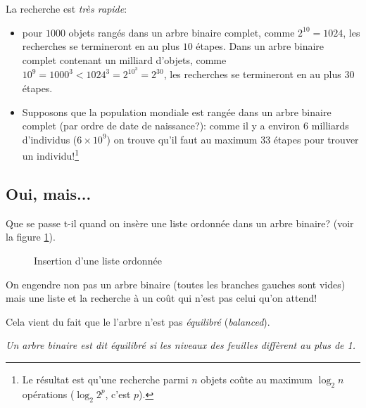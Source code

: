 La recherche est \emph{très rapide}:
\begin{itemize}
  \item pour $1000$ objets rangés dans un arbre binaire complet, comme
    $2^{10} =1024$, les recherches se termineront en au plus $10$
    étapes. Dans un arbre binaire complet contenant un milliard d'objets,
    comme  $10^9 = 1000^3 < 1024^3 = 2^{10^3} = 2^{30}$, les 
    recherches se termineront en au plus $30$ étapes. 
  \item Supposons que la population mondiale est rangée dans un arbre
    binaire complet (par ordre de date de naissance?): comme il y a
    environ 6 milliards d'individus  ($6 \times 10^9$) on trouve qu'il faut
    au maximum 33 étapes pour trouver un individu!\footnote{Le
      résultat est qu'une recherche parmi $n$ objets coûte au maximum
      $\log_2 n$ opérations ($\log_2 2^p$, c'est $p$).}
\end{itemize}
\subsection{Oui, mais...}
Que se passe t-il quand on insère une liste ordonnée dans un arbre
binaire? (voir la figure \ref{ordo}). 
\begin{figure}
\caption{Insertion d'une liste ordonnée}
\label{ordo}
\end{figure}
On engendre non pas un arbre binaire (toutes les branches gauches sont
vides) mais une liste et la recherche à un coût qui n'est pas celui
qu'on attend!

Cela vient du fait que le l'arbre n'est pas \emph{équilibré} (\emph{balanced}).

\emph{Un arbre binaire est dit équilibré si les niveaux des feuilles
  diffèrent au plus de 1.}\smallskip

